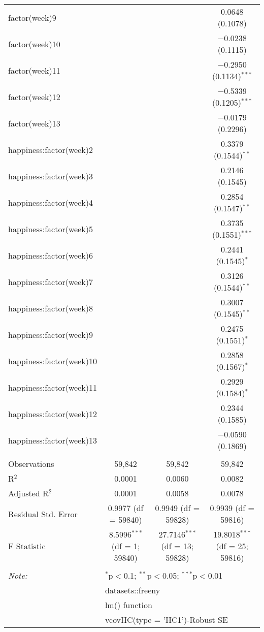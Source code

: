 \documentclass[
]{article}
\begin{document}
\begin{table}[!htbp]
\begin{tabular}{@{\extracolsep{5pt}}lccc}
  factor(week)9 &  &  & 0.0648 (0.1078) \\ 
  factor(week)10 &  &  & $-$0.0238 (0.1115) \\ 
  factor(week)11 &  &  & $-$0.2950 (0.1134)$^{***}$ \\ 
  factor(week)12 &  &  & $-$0.5339 (0.1205)$^{***}$ \\ 
  factor(week)13 &  &  & $-$0.0179 (0.2296) \\ 
  happiness:factor(week)2 &  &  & 0.3379 (0.1544)$^{**}$ \\ 
  happiness:factor(week)3 &  &  & 0.2146 (0.1545) \\ 
  happiness:factor(week)4 &  &  & 0.2854 (0.1547)$^{**}$ \\ 
  happiness:factor(week)5 &  &  & 0.3735 (0.1551)$^{***}$ \\ 
  happiness:factor(week)6 &  &  & 0.2441 (0.1545)$^{*}$ \\ 
  happiness:factor(week)7 &  &  & 0.3126 (0.1544)$^{**}$ \\ 
  happiness:factor(week)8 &  &  & 0.3007 (0.1545)$^{**}$ \\ 
  happiness:factor(week)9 &  &  & 0.2475 (0.1551)$^{*}$ \\ 
  happiness:factor(week)10 &  &  & 0.2858 (0.1567)$^{*}$ \\ 
  happiness:factor(week)11 &  &  & 0.2929 (0.1584)$^{*}$ \\ 
  happiness:factor(week)12 &  &  & 0.2344 (0.1585) \\ 
  happiness:factor(week)13 &  &  & $-$0.0590 (0.1869) \\ 
 \hline \\[-1.8ex] 
Observations & 59,842 & 59,842 & 59,842 \\ 
R$^{2}$ & 0.0001 & 0.0060 & 0.0082 \\ 
Adjusted R$^{2}$ & 0.0001 & 0.0058 & 0.0078 \\ 
Residual Std. Error & 0.9977 (df = 59840) & 0.9949 (df = 59828) & 0.9939 (df = 59816) \\ 
F Statistic & 8.5996$^{***}$ (df = 1; 59840) & 27.7146$^{***}$ (df = 13; 59828) & 19.8018$^{***}$ (df = 25; 59816) \\ 
\hline 
\hline \\[-1.8ex] 
\textit{Note:}  & \multicolumn{3}{l}{$^{*}$p$<$0.1; $^{**}$p$<$0.05; $^{***}$p$<$0.01} \\ 
 & \multicolumn{3}{l}{datasets::freeny} \\ 
 & \multicolumn{3}{l}{lm() function} \\ 
 & \multicolumn{3}{l}{vcovHC(type = 'HC1')-Robust SE} \\ 
\end{tabular} 
\end{table}
\end{document}
